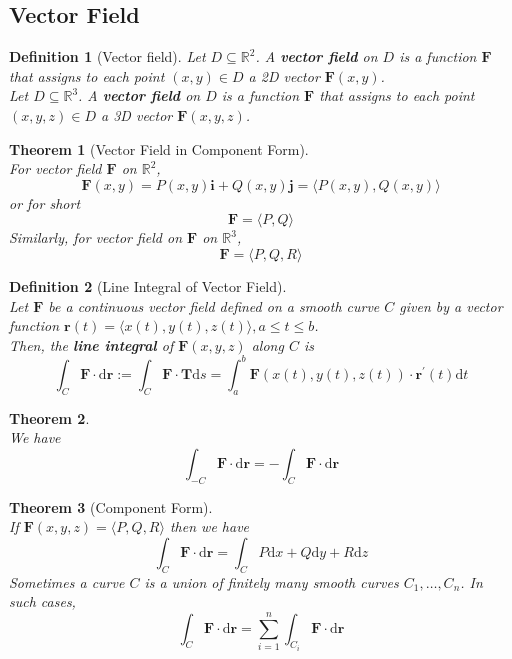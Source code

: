 \documentclass[12pt]{article}
\newtheorem{definition}{Definition}[section]
\newtheorem{theorem}{Theorem}[section]
\theoremstyle{definition}
\newcommand{\diff}{\mathrm{d}}
\begin{document}
\subsection{Vector Field}
\begin{definition}[Vector field]
Let $D\subseteq \mathbb{R}^2$. A \textbf{vector field} on $D$ is a function $\mathbf{F}$ that assigns to each point $(x,y)\in D$ a 2D vector $\mathbf{F}(x,y)$.\\
Let $D\subseteq \mathbb{R}^3$. A \textbf{vector field} on $D$ is a function $\mathbf{F}$ that assigns to each point $(x,y,z)\in D$ a 3D vector $\mathbf{F}(x,y,z)$.
\end{definition}
\begin{theorem}[Vector Field in Component Form]
\hfill\\\normalfont For vector field $\mathbf{F}$ on $\mathbb{R}^2$,
\[
\mathbf{F}(x,y) = P(x,y)\mathbf{i}+Q(x,y)\mathbf{j} = \langle P(x,y),Q(x,y)\rangle
\]
or for short
\[
\mathbf{F} = \langle P,Q\rangle
\]
Similarly, for vector field on $\mathbf{F}$ on $\mathbb{R}^3$,
\[
\mathbf{F} = \langle P,Q,R\rangle
\]
\end{theorem}
\begin{definition}[Line Integral of Vector Field]
\hfill\\\normalfont Let $\mathbf{F}$ be a continuous vector field defined on a smooth curve $C$ given by a vector function $\mathbf{r}(t) = \langle x(t),y(t),z(t)\rangle, a\leq t\leq b$. \\Then, the \textbf{line integral} of $\mathbf{F}(x,y,z)$ along $C$ is
\[
\int_C\mathbf{F}\cdot \diff\mathbf{r} :=\int_C\mathbf{F}\cdot\mathbf{T}\diff s = \int_a^b \mathbf{F}(x(t),y(t),z(t))\cdot \mathbf{r}^\prime(t)\diff t
\]
\end{definition}
\begin{theorem}\hfill\\\normalfont We have
\[
\int_{-C}\mathbf{F}\cdot\diff \mathbf{r} = -\int_C\mathbf{F}\cdot\diff\mathbf{r}
\]
\end{theorem}
\begin{theorem}[Component Form]
\hfill\\\normalfont If $\mathbf{F}(x,y,z)=\langle P,Q,R\rangle$ then we have
\[
\int_C\mathbf{F}\cdot\diff\mathbf{r} = \int_C P\diff x+Q\diff y+R\diff z
\]
Sometimes a curve $C$ is a union of finitely many smooth curves $C_1,\ldots, C_n$. In such cases,
\[
\int_C \mathbf{F}\cdot\diff\mathbf{r} = \sum_{i=1}^n\int_{C_i}\mathbf{F}\cdot\diff\mathbf{r}
\]
\end{theorem}
\end{document}
